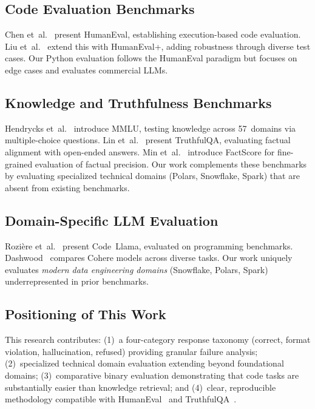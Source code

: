 \documentclass[conference]{IEEEtran}
\begin{document}
\subsection{Code Evaluation Benchmarks}

Chen et~al.~\cite{chen2021evaluating} present HumanEval, establishing execution-based code evaluation. Liu et~al.~\cite{liu2023humaneval} extend this with HumanEval+, adding robustness through diverse test cases. Our Python evaluation follows the HumanEval paradigm but focuses on edge cases and evaluates commercial LLMs.

\subsection{Knowledge and Truthfulness Benchmarks}

Hendrycks et~al.~\cite{hendrycks2020measuring} introduce MMLU, testing knowledge across 57~domains via multiple-choice questions. Lin et~al.~\cite{lin2022truthfulqa} present TruthfulQA, evaluating factual alignment with open-ended answers. Min et~al.~\cite{min2023factscore} introduce FactScore for fine-grained evaluation of factual precision. Our work complements these benchmarks by evaluating specialized technical domains (Polars, Snowflake, Spark) that are absent from existing benchmarks.

\subsection{Domain-Specific LLM Evaluation}

Rozi\`{e}re et~al.~\cite{roziere2024code} present Code~Llama, evaluated on programming benchmarks. Dashwood~\cite{dashwood2023cohere} compares Cohere models across diverse tasks. Our work uniquely evaluates \emph{modern data engineering domains} (Snowflake, Polars, Spark) underrepresented in prior benchmarks.

\subsection{Positioning of This Work}

This research contributes: (1)~a four-category response taxonomy (correct, format violation, hallucination, refused) providing granular failure analysis; (2)~specialized technical domain evaluation extending beyond foundational domains; (3)~comparative binary evaluation demonstrating that code tasks are substantially easier than knowledge retrieval; and (4)~clear, reproducible methodology compatible with HumanEval~\cite{chen2021evaluating} and TruthfulQA~\cite{lin2022truthfulqa}.
\end{document}
